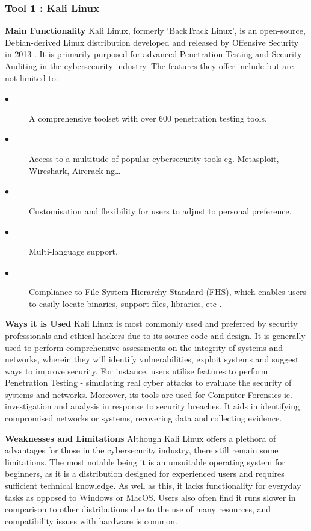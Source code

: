 \documentclass[a4paper, 11pt]{report}
\begin{document}
\subsubsection{Tool 1 : Kali Linux}
\textbf{Main Functionality} 
\newline Kali Linux, formerly ‘BackTrack Linux’, is an open-source, Debian-derived Linux distribution developed and released by Offensive Security in 2013 \cite{kali}. It is primarily purposed for advanced Penetration Testing and Security Auditing in the cybersecurity industry. The features they offer include but are not limited to:
\begin{description}
\item[$\bullet$] A comprehensive toolset with over 600 penetration testing tools.
\item[$\bullet$] Access to a multitude of popular cybersecurity tools eg. Metasploit, Wireshark, Aircrack-ng…
\item[$\bullet$] Customisation and flexibility for users to adjust to personal preference.
\item[$\bullet$] Multi-language support.
\item[$\bullet$] Compliance to File-System Hierarchy Standard (FHS), which enables users to easily locate binaries, support files, libraries, etc \cite{kali}.
\end{description}

\textbf{Ways it is Used} 
\newline Kali Linux is most commonly used and preferred by security professionals and ethical hackers due to its source code and design. It is generally used to perform comprehensive assessments on the integrity of systems and networks, wherein they will identify vulnerabilities, exploit systems and suggest ways to improve security. For instance, users utilise features to perform Penetration Testing - simulating real cyber attacks to evaluate the security of systems and networks. Moreover, its tools are used for Computer Forensics ie. investigation and analysis in response to security breaches. It aids in identifying compromised networks or systems, recovering data and collecting evidence.

\textbf{Weaknesses and Limitations}
\newline Although Kali Linux offers a plethora of advantages for those in the cybersecurity industry, there still remain some limitations. The most notable being it is an unsuitable operating system for beginners, as it is a distribution designed for experienced users and requires sufficient technical knowledge. As well as this, it lacks functionality for everyday tasks as opposed to Windows or MacOS. Users also often find it runs slower in comparison to other distributions due to the use of many resources, and compatibility issues with hardware is common.
\end{document}

